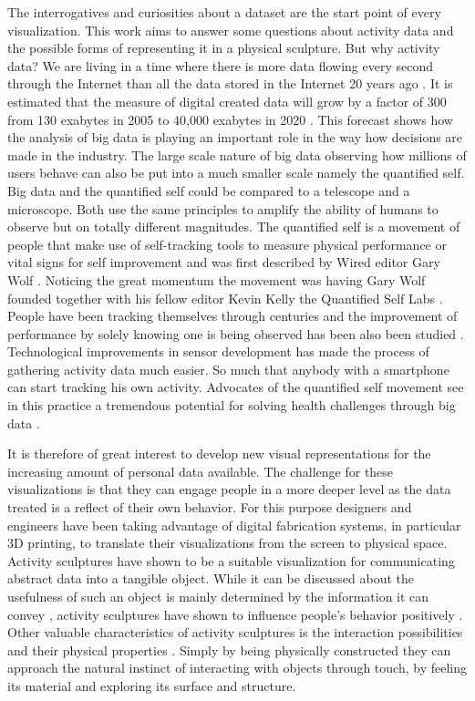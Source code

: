 \documentclass[../medieninformatik-arbeit.tex]{subfiles}
\begin{document}
The interrogatives and curiosities about a dataset are the start point of
every visualization. This work aims to answer some questions about activity data and the
possible forms of representing it in a physical sculpture. But why activity
data? We are living in a time where there is more data flowing every second through the
Internet than all the data stored in the Internet 20 years
ago  \cite{mayer2013big}. It is estimated that the measure of digital created data
will grow by a factor of 300 from 130 exabytes in 2005 to 40,000 exabytes in
2020 \cite{gantz2012digital}. This forecast shows how the analysis of big data is 
playing an important role in the way how decisions are made in the industry. The
large scale nature of big data observing how millions of users behave can also
be put into a much smaller scale namely the quantified self. Big data and the
quantified self could be compared to a telescope and a microscope. Both use the
same principles to amplify the ability of humans to observe but on totally
different magnitudes. The quantified self is a movement of people that make use of
self-tracking tools to measure physical performance or vital signs for self
improvement and was first described by Wired editor Gary
Wolf \cite{wolf2009know}. Noticing the great momentum the movement was having
Gary Wolf founded together with his fellow editor Kevin Kelly the Quantified
Self Labs \cite{quantified:2015:Online}. People have been
tracking themselves through centuries and the improvement of performance by
solely knowing one is being observed has been also
been studied \cite{mccarney2007hawthorne}. Technological improvements in
sensor development has made the process of gathering activity data much easier.
So much that anybody with a smartphone can start tracking his own activity.
Advocates of the quantified self movement see in this practice a tremendous
potential for solving health challenges through big
data \cite{swan2013quantified}. 

It is therefore  of great interest to develop new
visual representations for the increasing amount of personal data available. The
challenge for these visualizations is that they can engage people in a more
deeper level as the data treated is a reflect of their own behavior. For this
purpose designers and engineers have been taking advantage of digital
fabrication systems, in particular 3D printing, to translate their
visualizations from the screen to physical space. Activity sculptures have shown
to be a suitable visualization for communicating abstract data into a tangible
object. While it can be discussed about the usefulness of such an object is
mainly determined by the information it can convey \cite{zhao2008embodiment}, 
activity sculptures have shown to influence people's behavior
positively \cite{khot2014understanding}. Other valuable characteristics of activity
sculptures is the interaction possibilities and their physical 
properties \cite{zhao2008embodiment}. Simply by being physically constructed they
can approach the natural instinct of interacting with objects through touch, 
by feeling its material and exploring its surface and structure.
\end{document}
